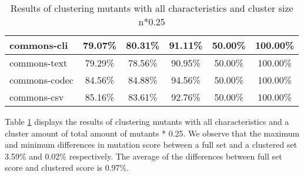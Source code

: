 \documentclass[../main]{subfiles}
\begin{document}
\begin{table}[htb]
\begin{tabular}{|l|c|c|c|c|c|}
commons-cli                   & 79.07\%                                                                                 & 80.31\%                                                                                     & 91.11\%                                                                              & 50.00\%                                                                               & 100.00\%                                                                             \\ \hline
commons-text                  & 79.29\%                                                                                 & 78.56\%                                                                                     & 90.95\%                                                                              & 50.00\%                                                                               & 100.00\%                                                                             \\ \hline
commons-codec                 & 84.56\%                                                                                 & 84.88\%                                                                                     & 94.56\%                                                                              & 50.00\%                                                                               & 100.00\%                                                                             \\ \hline
commons-csv                   & 85.16\%                                                                                 & 83.61\%                                                                                     & 92.76\%                                                                              & 50.00\%                                                                               & 100.00\%                                                                             \\ \hline
\end{tabular}
\caption{\label{tab:clustering_all_25}Results of clustering mutants with all characteristics and cluster size n*0.25}
\end{table}
\FloatBarrier

Table \ref{tab:clustering_all_25} displays the results of clustering mutants with all characteristics and a cluster amount of total amount of mutants * 0.25. 
We observe that the maximum and minimum differences in mutation score between a full set and a clustered set  3.59\% and 0.02\% respectively.
The average of the differences between full set score and clustered score is 0.97\%.
\end{document}
